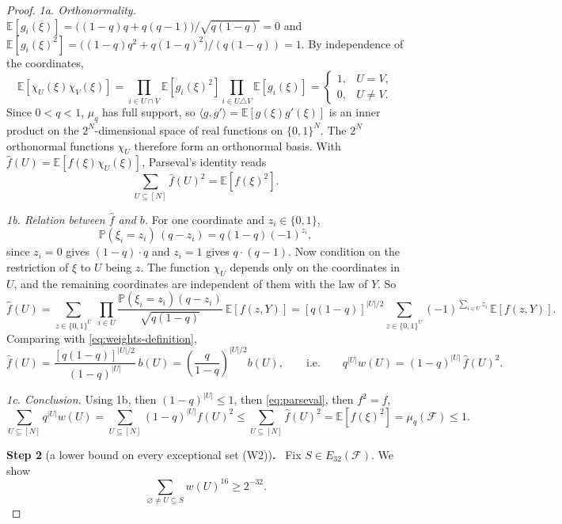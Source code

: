 \documentclass[11pt,letterpaper]{article}
\theoremstyle{definition}
\theoremstyle{remark}
\numberwithin{equation}{section}
\newcommand{\step}[2]{\medskip\noindent\textbf{Step #1} (#2)\textbf{.}\ }
\begin{document}
\begin{proof}
\emph{1a. Orthonormality.}
$\mathbb E[g_i(\xi)]=\bigl((1-q)q+q(q-1)\bigr)/\sqrt{q(1-q)}=0$ and
$\mathbb E[g_i(\xi)^2]=\bigl((1-q)q^2+q(1-q)^2\bigr)/(q(1-q))=1$.
By independence of the coordinates,
\[
\mathbb E[\chi_U(\xi)\chi_V(\xi)]
=\prod_{i\in U\cap V}\mathbb E[g_i(\xi)^2]
 \prod_{i\in U\triangle V}\mathbb E[g_i(\xi)]
=\begin{cases}1,&U=V,\\0,&U\ne V.\end{cases}
\]
Since $0<q<1$, $\mu_q$ has full support, so
$\langle g,g'\rangle=\mathbb E[g(\xi)g'(\xi)]$ is an inner product on the
$2^N$-dimensional space of real functions on $\{0,1\}^N$. The $2^N$
orthonormal functions $\chi_U$ therefore form an orthonormal basis. With
$\widehat f(U)=\mathbb E[f(\xi)\chi_U(\xi)]$, Parseval's identity reads
\begin{equation}\label{eq:parseval}
\sum_{U\subseteq[N]}\widehat f(U)^2=\mathbb E[f(\xi)^2].
\end{equation}

\emph{1b. Relation between $\widehat f$ and $b$.}
For one coordinate and $z_i\in\{0,1\}$,
\[
 \mathbb P(\xi_i=z_i)\,(q-z_i)=q(1-q)(-1)^{z_i},
\]
since $z_i=0$ gives $(1-q)\cdot q$ and $z_i=1$ gives $q\cdot(q-1)$.
Now condition on the restriction of $\xi$ to $U$ being $z$. The function
$\chi_U$ depends only on the coordinates in $U$, and the remaining
coordinates are independent of them with the law of $Y$. So
\[
 \widehat f(U)
 =\sum_{z\in\{0,1\}^U}\ \prod_{i\in U}
 \frac{\mathbb P(\xi_i=z_i)(q-z_i)}{\sqrt{q(1-q)}}\ \mathbb E[f(z,Y)]
 =[q(1-q)]^{|U|/2}
 \sum_{z\in\{0,1\}^{U}}(-1)^{\sum_{i\in U}z_i}\,
 \mathbb E[f(z,Y)] .
\]
Comparing with \eqref{eq:weights-definition},
\[
\widehat f(U)=\frac{[q(1-q)]^{|U|/2}}{(1-q)^{|U|}}\,b(U)
=\left(\frac{q}{1-q}\right)^{|U|/2}b(U),
\qquad\text{i.e.}\qquad
q^{|U|}w(U)=(1-q)^{|U|}\,\widehat f(U)^2 .
\]

\emph{1c. Conclusion.} Using 1b, then $(1-q)^{|U|}\le1$, then
\eqref{eq:parseval}, then $f^2=f$,
\[
 \sum_{U\subseteq[N]}q^{|U|}w(U)
 =\sum_{U\subseteq[N]}(1-q)^{|U|}\widehat f(U)^2
 \le\sum_{U\subseteq[N]}\widehat f(U)^2
 =\mathbb E[f(\xi)^2]
 =\mu_q(\mathcal F)\le1 .
\]

\step{2}{a lower bound on every exceptional set \textup{(W2)}}
Fix $S\in E_{32}(\mathcal F)$. We show
\begin{equation}\label{eq:exceptional-weight-bound}
 \sum_{\varnothing\ne U\subseteq S}w(U)^{16}\ge2^{-32}.
\end{equation}


\end{proof}
\end{document}
